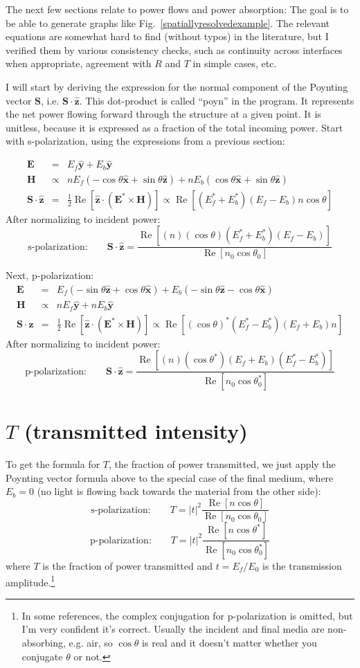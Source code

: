\documentclass[12pt]{article}
\newcommand{\bea}{\begin{eqnarray*}} %
\newcommand{\eea}{\end{eqnarray*}} %
\renewcommand{\(}{\left(}
\renewcommand{\)}{\right)}
\renewcommand{\Re}{\operatorname{Re}}
\newcommand{\E}{\mathbf{E}}
\renewcommand{\H}{\mathbf{H}}
\renewcommand{\S}{\mathbf{S}}
\newcommand{\x}{\hat{\mathbf{x}}}
\newcommand{\y}{\hat{\mathbf{y}}}
\newcommand{\z}{\hat{\mathbf{z}}}
\begin{document}
The next few sections relate to power flows and power absorption: The goal is to be able to generate graphs like Fig.~\ref{spatiallyresolvedexample}. The relevant equations are somewhat hard to find (without typos) in the literature, but I verified them by various consistency checks, such as continuity across interfaces when appropriate, agreement with $R$ and $T$ in simple cases, etc.

I will start by deriving the expression for the normal component of the Poynting vector $\S$, i.e. $\S\cdot\z$. This dot-product is called ``poyn'' in the program. It represents the net power flowing forward through the structure at a given point. It is unitless, because it is expressed as a fraction of the total incoming power. Start with s-polarization, using the expressions from a previous section:

\bea
\E &=& E_f \y + E_b \y \\
\H &\propto& n E_f \( - \cos \theta \x +  \sin \theta \z\) + n E_b\( \cos \theta \x + \sin \theta \z\) \\
\S \cdot \z &=& \frac12 \Re[ \z \cdot (\E^* \times \H)] \propto \Re[(E_f^*+E_b^*) (E_f - E_b)n \cos \theta]\eea
After normalizing to incident power:
$$\text{s-polarization:} \qquad \S \cdot \z = \frac{\Re\left[ (n) (\cos \theta) (E_f^* + E_b^*) (E_f - E_b)\right]}{\Re\left[ n_0 \cos \theta_0\right] }$$

Next, p-polarization:
\bea
\E &=& E_f(-\sin \theta \z +  \cos \theta \x) + E_b(- \sin \theta \z -  \cos \theta \x) \\
\H &\propto& n E_f \y + n E_b \y \\
\S \cdot \z &=& \frac12\Re[ \z \cdot (\E^* \times \H)] \propto \Re[(\cos \theta)^*(E_f^*-E_b^*) (E_f + E_b)n ]\eea
After normalizing to incident power:
$$\text{p-polarization:} \qquad \S \cdot \z = \frac{\Re\left[ (n) (\cos \theta^*) (E_f + E_b) (E_f^* - E_b^*)\right]}{\Re \left[ n_0 \cos \theta_0^* \right]}$$

\section{$T$ (transmitted intensity)}

To get the formula for $T$, the fraction of power transmitted, we just apply the Poynting vector formula above to the special case of the final medium, where $E_b=0$ (no light is flowing back towards the material from the other side):
$$\text{s-polarization:} \qquad T = |t|^2\frac{ \Re\left[ n \cos \theta\right]}{\Re \left[ n_0 \cos \theta_0 \right] }$$
$$\text{p-polarization:} \qquad T = |t|^2\frac{ \Re\left[ n \cos \theta^* \right]}{\Re \left[ n_0 \cos \theta_0^* \right] }$$
where $T$ is the fraction of power transmitted and $t=E_f/E_0$ is the transmission amplitude.\footnote{In some references, the complex conjugation for p-polarization is omitted, but I'm very confident it's correct. Usually the incident and final media are non-absorbing, e.g. air, so $\cos \theta$ is real and it doesn't matter whether you conjugate $\theta$ or not.}
\end{document}
